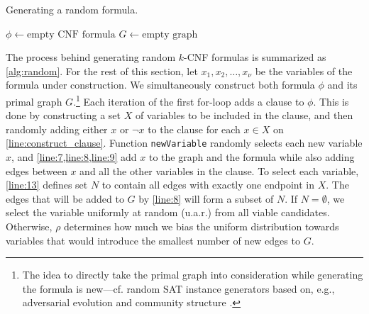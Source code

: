 \begin{algorithm}[t]
  \caption{Generating a random formula.}\label{alg:random}
  $\phi \gets \text{empty CNF formula}$\;
  $G \gets \text{empty graph}$\;
  \Return{$\phi$}\;
\end{algorithm}

The process behind generating random $k$-CNF formulas is summarized as
\cref{alg:random}. For the rest of this section, let $x_1, x_2, \dots, x_\nu$ be
the variables of the formula under construction. We simultaneously construct
both formula $\phi$ and its primal graph $G$.\footnote{The idea to directly take
  the primal graph into consideration while generating the formula is new---cf.
  random SAT instance generators based on, e.g., adversarial evolution
  \citep{DBLP:conf/cec/HossainALA10} and community structure
  \citep{DBLP:journals/ai/Giraldez-CruL16}.} Each iteration of the first
for-loop adds a clause to $\phi$. This is done by constructing a set $X$ of
variables to be included in the clause, and then randomly adding either $x$ or
$\neg x$ to the clause for each $x \in X$ on \cref{line:construct_clause}.
Function \texttt{newVariable} randomly selects each new variable $x$, and
\cref{line:7,line:8,line:9} add $x$ to the graph and the formula while also
adding edges between $x$ and all the other variables in the clause. To select
each variable, \cref{line:13} defines set $N$ to contain all edges with exactly
one endpoint in $X$. The edges that will be added to $G$ by \cref{line:8} will
form a subset of $N$. If $N = \emptyset$, we select the variable uniformly at
random (u.a.r.) from all viable candidates. Otherwise, $\rho$ determines how
much we bias the uniform distribution towards variables that would introduce the
smallest number of new edges to $G$.

